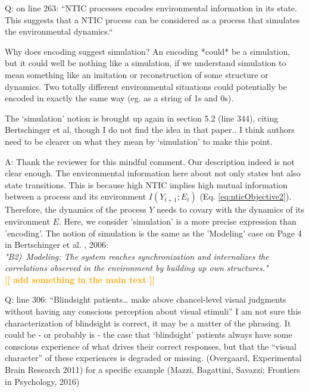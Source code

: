 \documentclass[utf8]{article}
\newcounter{cQuestion}[section]
\newenvironment{question}
    {\refstepcounter{cQuestion}\color{Blue}\noindent\newline Q\thecQuestion:}
    {~\newline}
\newenvironment{ans}  
    {\color{Black}\noindent A:}
    {~\newline}
\newcommand{\toWrite}[1]{\noindent
	\textcolor{Orange}{\textbf{[[ #1 ]]}}}
\begin{document}
    
    	\begin{question}
    		on line 263: “NTIC processes encodes environmental information in its state. This suggests that a NTIC process can be considered as a process that simulates the environmental dynamics.“
    		
    		Why does encoding suggest simulation? An encoding *could* be a simulation, but it could well be nothing like a simulation, if we understand simulation to mean something like an imitation or reconstruction of some structure or dynamics. Two totally different environmental situations could potentially be encoded in exactly the same way (eg. as a string of 1s and 0s).
    		
    		The ‘simulation’ notion is brought up again in section 5.2 (line 344), citing Bertschinger et al, though I do not find the idea in that paper.. I think authors need to be clearer on what they mean by ‘simulation’ to make this point.
    	\end{question}
    
    	\begin{ans}
    		Thank the reviewer for this mindful comment. 
    		Our description indeed is not clear enough. The environmental information here about not only states but also state transitions. 
    		This is because high NTIC implies high mutual information between a process and its environment $I(Y_{t+1};E_t)$ (Eq. \ref{eq:nticObjective2}). Therefore, the dynamics of the process $Y$ needs to covary with the dynamics of its environment $E$. Here, we consider 'simulation' is a more precise expression than 'encoding'. 
    		The notion of simulation is the same as the 'Modeling' case on Page 4 in Bertschinger et al. , 2006: \\
    		\textit{"B2)~Modeling: The system reaches synchronization and internalizes the correlations observed in the environment by building up own structures."}
    		\\ \toWrite{add something in the main text}
    	\end{ans}
    
   	\begin{question}
			line 306: “Blindsight patients… make above chancel-level visual judgments without having any conscious perception about visual stimuli” I am not sure this characterization of blindsight is correct, it may be a matter of the phrasing. It could be - or probably is - the case that ‘blindsight’ patients always have some conscious experience of what drives their correct responses, but that the “visual character” of these experiences is degraded or missing.
			(Overgaard, Experimental Brain Research 2011)
			for a specific example
			(Mazzi, Bagattini, Savazzi; Frontiers in Psychology, 2016)
    	\end{question}
    
\end{document}
